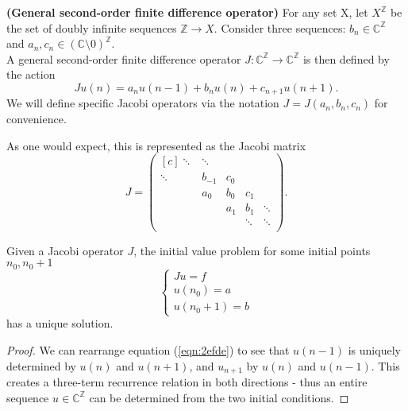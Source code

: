\documentclass[../main.tex]{subfiles}
\begin{document}
\begin{definition}{\textbf{(General second-order finite difference operator)}}
  For any set X, let $X^\mathbb{Z}$ be the set of doubly infinite sequences $\mathbb{Z}
  \rightarrow X$. Consider three sequences:
  $b_n \in \mathbb{C}^\mathbb{Z}$
  and $a_n, c_n \in (\mathbb{C} \setminus 0)^\mathbb{Z}$.\\
  A general second-order finite difference operator 
  $J: \mathbb{C}^\mathbb{Z} \rightarrow \mathbb{C}^\mathbb{Z}$
  is then defined by the action 
  \begin{equation}
  \label{eqn:2efde}
    Ju (n) = a_n u(n-1) + b_n u(n) + c_{n+1} u(n+1).
  \end{equation}
  We will define specific Jacobi operators via the notation $J = J(a_n, b_n, c_n)$
  for convenience.
\end{definition}

As one would expect, this is represented as the Jacobi matrix
  $$ 
  J = 
  \begin{pmatrix*}[c]
    \ddots & \ddots & & & \\
    \ddots & b_{-1} & c_0 & & \\
    & a_0 & b_0 & c_1 & \\
    & & a_1 & b_1 & \ddots \\
    & & & \ddots & \ddots \\
  \end{pmatrix*}.
  $$
\begin{proposition}\label{thm:2efde-sols} 
  Given a Jacobi operator $J$, the initial value problem for some initial points
  $n_0, n_0 + 1$
  $$
  \begin{cases}
    Ju = f\\
    u(n_0) = a\\ u(n_0 + 1) = b
  \end{cases} 
  $$
  has a unique solution.
\end{proposition}
\begin{proof}
We can rearrange equation (\ref{eqn:2efde}) to see that $u(n-1)$ is uniquely
determined by $u(n)$ and $u(n+1)$, and $u_{n+1}$ by $u(n)$ and
$u(n-1)$. This creates a three-term recurrence relation in both directions -
thus an entire sequence $u \in \mathbb{C}^\mathbb{Z}$ can be determined from the two
initial conditions.
\end{proof}
\end{document}
